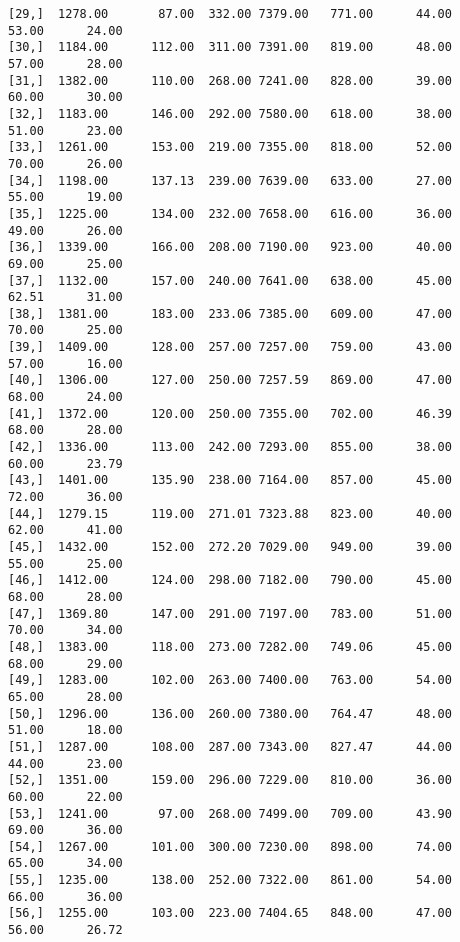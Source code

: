 \documentclass[11pt]{article}
\begin{document}
\begin{verbatim}
[29,]  1278.00       87.00  332.00 7379.00   771.00      44.00     53.00      24.00
[30,]  1184.00      112.00  311.00 7391.00   819.00      48.00     57.00      28.00
[31,]  1382.00      110.00  268.00 7241.00   828.00      39.00     60.00      30.00
[32,]  1183.00      146.00  292.00 7580.00   618.00      38.00     51.00      23.00
[33,]  1261.00      153.00  219.00 7355.00   818.00      52.00     70.00      26.00
[34,]  1198.00      137.13  239.00 7639.00   633.00      27.00     55.00      19.00
[35,]  1225.00      134.00  232.00 7658.00   616.00      36.00     49.00      26.00
[36,]  1339.00      166.00  208.00 7190.00   923.00      40.00     69.00      25.00
[37,]  1132.00      157.00  240.00 7641.00   638.00      45.00     62.51      31.00
[38,]  1381.00      183.00  233.06 7385.00   609.00      47.00     70.00      25.00
[39,]  1409.00      128.00  257.00 7257.00   759.00      43.00     57.00      16.00
[40,]  1306.00      127.00  250.00 7257.59   869.00      47.00     68.00      24.00
[41,]  1372.00      120.00  250.00 7355.00   702.00      46.39     68.00      28.00
[42,]  1336.00      113.00  242.00 7293.00   855.00      38.00     60.00      23.79
[43,]  1401.00      135.90  238.00 7164.00   857.00      45.00     72.00      36.00
[44,]  1279.15      119.00  271.01 7323.88   823.00      40.00     62.00      41.00
[45,]  1432.00      152.00  272.20 7029.00   949.00      39.00     55.00      25.00
[46,]  1412.00      124.00  298.00 7182.00   790.00      45.00     68.00      28.00
[47,]  1369.80      147.00  291.00 7197.00   783.00      51.00     70.00      34.00
[48,]  1383.00      118.00  273.00 7282.00   749.06      45.00     68.00      29.00
[49,]  1283.00      102.00  263.00 7400.00   763.00      54.00     65.00      28.00
[50,]  1296.00      136.00  260.00 7380.00   764.47      48.00     51.00      18.00
[51,]  1287.00      108.00  287.00 7343.00   827.47      44.00     44.00      23.00
[52,]  1351.00      159.00  296.00 7229.00   810.00      36.00     60.00      22.00
[53,]  1241.00       97.00  268.00 7499.00   709.00      43.90     69.00      36.00
[54,]  1267.00      101.00  300.00 7230.00   898.00      74.00     65.00      34.00
[55,]  1235.00      138.00  252.00 7322.00   861.00      54.00     66.00      36.00
[56,]  1255.00      103.00  223.00 7404.65   848.00      47.00     56.00      26.72


\end{verbatim}
\end{document}

